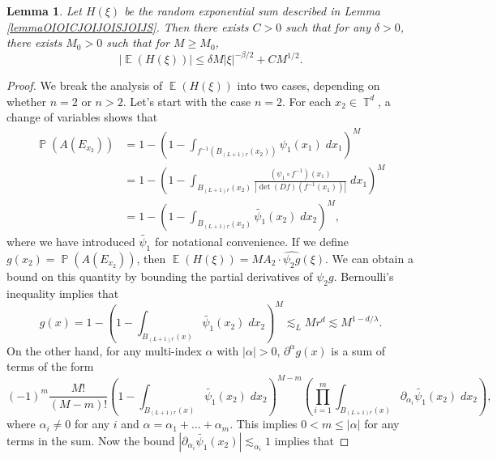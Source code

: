 \documentclass[dvipsnames,letterpaper,12pt]{article}
\numberwithin{equation}{section}
\DeclareMathOperator{\TT}{\mathbb{T}}
\newtheorem{lemma}[theorem]{Lemma}
\numberwithin{theorem}{section}
\DeclareMathOperator{\EE}{\mathbb{E}}
\DeclareMathOperator{\PP}{\mathbb{P}}
\begin{document}
\begin{lemma} \label{lemmaOIJIOCJSOIJSIOJ123}
    Let $H(\xi)$ be the random exponential sum described in Lemma \ref{lemmaOIOICJOIJOISJOIJS}. Then there exists $C > 0$ such that for any $\delta > 0$, there exists $M_0 > 0$ such that for $M \geq M_0$,
    \[ |\EE(H(\xi))| \leq \delta M |\xi|^{-\beta/2} + C M^{1/2}. \]
\end{lemma}
\begin{proof}
    We break the analysis of $\EE(H(\xi))$ into two cases, depending on whether $n = 2$ or $n > 2$. Let's start with the case $n = 2$. For each $x_2 \in \TT^d$, a change of variables shows that
    \begin{equation}
    \begin{split}
        \PP(A(E_{x_2})) &= 1 - \left( 1 - \int_{f^{-1}(B_{(L+1)r}(x_2))} \psi_1(x_1)\; dx_1 \right)^M\\
        &= 1 - \left( 1 - \int_{B_{(L+1) r}(x_2)} \frac{(\psi_1 \circ f^{-1})(x_1)}{|\det(Df)(f^{-1}(x_1))|}\; dx_1 \right)^M\\
        &= 1 - \left( 1 - \int_{B_{(L+1)r}(x_2)} \tilde{\psi_1}(x_2)\; dx_2 \right)^M,
    \end{split}
    \end{equation}
    where we have introduced $\tilde{\psi_1}$ for notational convenience. If we define $g(x_2) = \PP(A(E_{x_2}))$, then  $\EE(H(\xi)) = M A_2 \cdot \widehat{\psi_2 g}(\xi)$. We can obtain a bound on this quantity by bounding the partial derivatives of $\psi_2 g$. Bernoulli's inequality implies that
    \begin{equation}
        g(x) = 1 - \left( 1 - \int_{B_{(L+1)r}(x)} \tilde{\psi_1}(x_2)\; dx_2 \right)^M \lesssim_L M r^d \lesssim M^{1 - d/\lambda}.
    \end{equation}
    On the other hand, for any multi-index $\alpha$ with $|\alpha| > 0$, $\partial^\alpha g(x)$ is a sum of terms of the form
    \begin{equation} \label{equationDOIJACOIJCIOJ3123123214312}
        (-1)^m \frac{M!}{(M-m)!} \left( 1 - \int_{B_{(L+1) r}(x)} \tilde{\psi_1}(x_2)\; dx_2 \right)^{M-m} \left( \prod_{i = 1}^{m} \int_{B_{(L+1)r}(x)} \partial_{\alpha_i} \tilde{\psi_1}(x_2)\; dx_2 \right),
    \end{equation}
    where $\alpha_i \neq 0$ for any $i$ and $\alpha = \alpha_1 + \dots + \alpha_m$. This implies $0 < m \leq |\alpha|$ for any terms in the sum. Now the bound $|\partial_{\alpha_i} \tilde{\psi_1}(x_2)| \lesssim_{\alpha_i} 1$ implies that

\end{proof}
\end{document}
